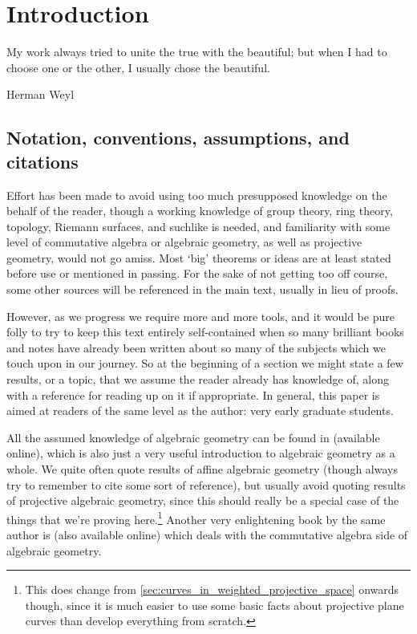 \documentclass[10pt,notitlepage]{article}
\numberwithin{equation}{subsection}
\begin{document}
    \vspace{-3em}
    \tableofcontents



    \clearpage


\section{Introduction} %
\label{sec:introduction}


    \epigraph{
        My work always tried to unite the true with the beautiful; but when I had to choose one or the other, I usually chose the beautiful.
    }{Herman Weyl}

    \vspace{-2em}
    
    \subsection{Notation, conventions, assumptions, and citations} %
    \label{sub:notation_and_conventions}

    Effort has been made to avoid using too much presupposed knowledge on the behalf of the reader, though a working knowledge of group theory, ring theory, topology, Riemann surfaces, and suchlike is needed, and familiarity with some level of commutative algebra or algebraic geometry, as well as projective geometry, would not go amiss.
    Most `big' theorems or ideas are at least stated before use or mentioned in passing.
    For the sake of not getting too off course, some other sources will be referenced in the main text, usually in lieu of proofs.

    However, as we progress we require more and more tools, and it would be pure folly to try to keep this text entirely self-contained when so many brilliant books and notes have already been written about so many of the subjects which we touch upon in our journey.
    So at the beginning of a section we might state a few results, or a topic, that we assume the reader already has knowledge of, along with a reference for reading up on it if appropriate.
    In general, this paper is aimed at readers of the same level as the author: very early graduate students.

    \bigskip

    All the assumed knowledge of algebraic geometry can be found in \cite{Reid:1988wa} (available online), which is also just a very useful introduction to algebraic geometry as a whole.
    We quite often quote results of affine algebraic geometry (though always try to remember to cite some sort of reference), but usually avoid quoting results of projective algebraic geometry, since this should really be a special case of the things that we're proving here.\footnote{%
        This does change from \cref{sec:curves_in_weighted_projective_space} onwards though, since it is much easier to use some basic facts about projective plane curves than develop everything from scratch.
    }
    Another very enlightening book by the same author is \cite{Reid:1995tu} (also available online) which deals with the commutative algebra side of algebraic geometry.
\end{document}
